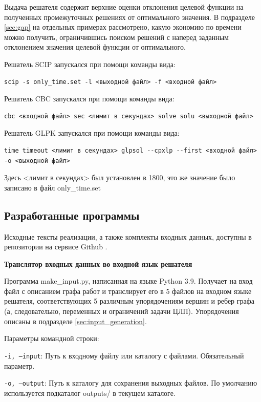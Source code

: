 Выдача решателя содержит верхние оценки отклонения целевой функции на полученных промежуточных решениях от оптимального значения. В подразделе \ref{sec:gap} на отдельных примерах рассмотрено, какую экономию по времени можно получить, ограничившись поиском решений с наперед заданным отклонением значения целевой функции от оптимального.

Решатель SCIP запускался при помощи команды вида:
\begin{verbatim}
scip -s only_time.set -l <выходной файл> -f <входной файл>
\end{verbatim}

Решатель CBC запускался при помощи команды вида:
\begin{verbatim}
cbc <входной файл> sec <лимит в секундах> solve solu <выходной файл>
\end{verbatim}

Решатель GLPK запускался при помощи команды вида:
\begin{verbatim}
time timeout <лимит в секундах> glpsol --cpxlp --first <входной файл> 
-o <выходной файл>
\end{verbatim}

Здесь <лимит в секундах> был установлен в 1800, это же значение было записано в файл only\_time.set

\subsection{Разработанные программы}
\label{programs}

Исходные тексты реализации, а также комплекты входных данных, доступны в репозитории на сервисе Github \cite{GITHUB}.

\textbf{Транслятор входных данных во входной язык решателя}

Программа make\_input.py, написанная на языке Python 3.9. Получает на вход
файл с описанием графа работ и транслирует его в 5 файлов на входном
языке решателя, соответствующих 5 различным упорядочениям вершин и
ребер графа (а, следовательно, переменных и ограничений задачи ЦЛП). Упорядочения описаны в подразделе \ref{sec:input_generation}.

Параметры командной строки:

\texttt{-i, --input}: Путь к входному файлу или каталогу с файлами. Обязательный параметр.

\texttt{-o, --output}: Путь к каталогу для сохранения выходных файлов. По умолчанию используется подкаталог outputs/ в текущем каталоге.

